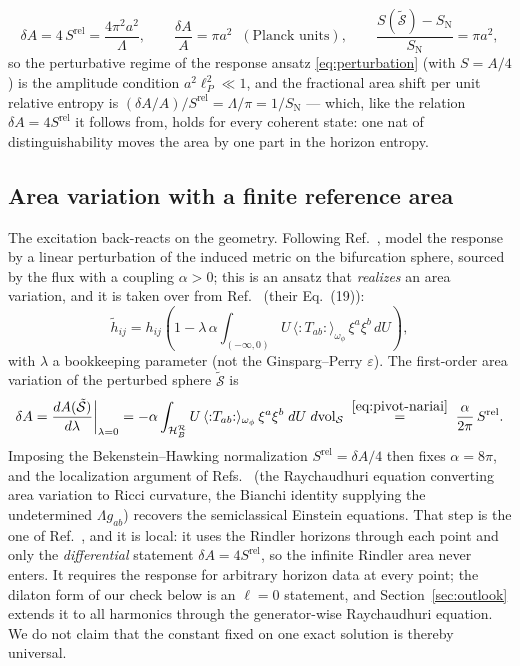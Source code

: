 \documentclass[11pt]{article}
\newcommand{\Srel}{S^{\mathrm{rel}}}
\begin{document}
\begin{equation}
\delta A = 4\,\Srel = \frac{4\pi^2 a^2}{\Lambda},
\qquad
\frac{\delta A}{A} = \pi a^2
\;\;(\text{Planck units}),
\qquad
\frac{S(\tilde{\mathcal{S}})-S_{\mathrm N}}{S_{\mathrm N}} = \pi a^2,
\label{eq:example-area}
\end{equation}
so the perturbative regime of the response ansatz \eqref{eq:perturbation} (with $S=A/4$) is the amplitude condition $a^2 \ell_P^2 \ll 1$, and the fractional area shift per unit relative entropy is $(\delta A/A)/\Srel = \Lambda/\pi = 1/S_{\mathrm{N}}$ --- which, like the relation $\delta A=4\Srel$ it follows from, holds for every coherent state: one nat of distinguishability moves the area by one part in the horizon entropy.

\subsection{Area variation with a finite reference area}

The excitation back-reacts on the geometry. Following Ref.~\cite{DorauMuch}, model the response by a linear perturbation of the induced metric on the bifurcation sphere, sourced by the flux with a coupling $\alpha > 0$; this is an ansatz that \emph{realizes} an area variation, and it is taken over from Ref.~\cite{DorauMuch} (their Eq.~(19)):
\begin{equation}
\tilde{h}_{ij}
= h_{ij}\left(1 - \lambda\,\alpha \int_{(-\infty,0)} U\, \langle{:}T_{ab}{:}\rangle_{\omega_\phi}\, \xi^a\xi^b \, dU \right),
\label{eq:perturbation}
\end{equation}
with $\lambda$ a bookkeeping parameter (not the Ginsparg--Perry $\varepsilon$). The first-order area variation of the perturbed sphere $\tilde{\mathcal{S}}$ is
\begin{equation}
\delta A
= \frac{dA(\tilde{\mathcal{S}})}{d\lambda}\bigg|_{\lambda = 0}
= -\alpha \int_{\mathcal{H}_B^{\mathcal{R}}} U\, \langle{:}T_{ab}{:}\rangle_{\omega_\phi}\, \xi^a\xi^b \; dU\; d\mathrm{vol}_{\mathcal{S}}
\;\overset{\eqref{eq:pivot-nariai}}{=}\;
\frac{\alpha}{2\pi}\, \Srel .
\label{eq:deltaA-nariai}
\end{equation}
Imposing the Bekenstein--Hawking normalization $\Srel = \delta A / 4$ then fixes $\alpha = 8\pi$, and the localization argument of Refs.~\cite{Jacobson,DorauMuch} (the Raychaudhuri equation converting area variation to Ricci curvature, the Bianchi identity supplying the undetermined $\Lambda g_{ab}$) recovers the semiclassical Einstein equations. That step is the one of Ref.~\cite{DorauMuch}, and it is local: it uses the Rindler horizons through each point and only the \emph{differential} statement $\delta A=4\Srel$, so the infinite Rindler area never enters. It requires the response for arbitrary horizon data at every point; the dilaton form of our check below is an $\ell=0$ statement, and Section~\ref{sec:outlook} extends it to all harmonics through the generator-wise Raychaudhuri equation. We do not claim that the constant fixed on one exact solution is thereby universal.
\end{document}
